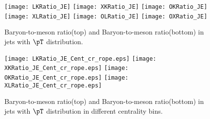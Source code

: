 \begin{figure}[ht]
        \begin{center}
                \texttt{[image: LKRatio\_JE]}
                \texttt{[image: XKRatio\_JE]}
                \texttt{[image: OKRatio\_JE]}
                \texttt{[image: XLRatio\_JE]}
                \texttt{[image: OLRatio\_JE]}
                \texttt{[image: OXRatio\_JE]}
        \end{center}
        \caption{Baryon-to-meson ratio(top) and Baryon-to-meson ratio(bottom) in jets with $\pT$ distribution.}
        \label{fig:JEParRatio}
\end{figure}

\begin{figure}[ht]
        \begin{center}
                \texttt{[image: LKRatio\_JE\_Cent\_cr\_rope.eps]}
                \texttt{[image: XKRatio\_JE\_Cent\_cr\_rope.eps]}
                \texttt{[image: OKRatio\_JE\_Cent\_cr\_rope.eps]}
                \texttt{[image: XLRatio\_JE\_Cent\_cr\_rope.eps]}
        \end{center}
        \caption{Baryon-to-meson ratio(top) and Baryon-to-meson ratio(bottom) in jets with $\pT$ distribution in different centrality bins.}
        \label{fig:JEParRatioCent}
\end{figure}
